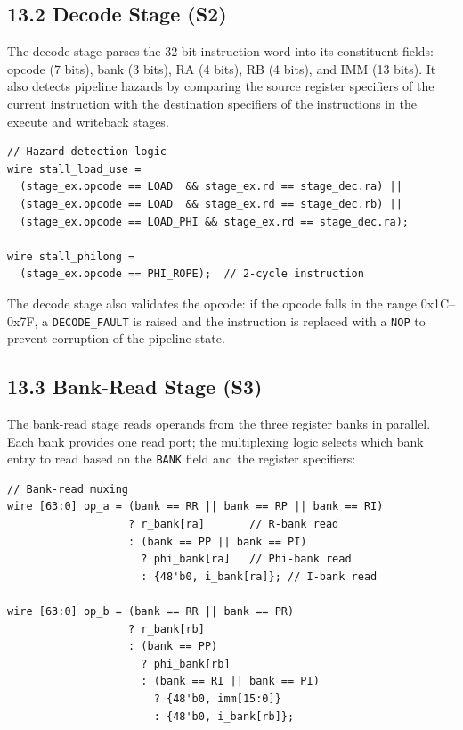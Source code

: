\subsection{13.2 Decode Stage (S2)}\label{fa_71:decode}

The decode stage parses the 32-bit instruction word into its
constituent fields: opcode (7 bits), bank (3 bits), RA (4 bits),
RB (4 bits), and IMM (13 bits). It also detects pipeline hazards
by comparing the source register specifiers of the current
instruction with the destination specifiers of the instructions
in the execute and writeback stages.

\begin{verbatim}
// Hazard detection logic
wire stall_load_use =
  (stage_ex.opcode == LOAD  && stage_ex.rd == stage_dec.ra) ||
  (stage_ex.opcode == LOAD  && stage_ex.rd == stage_dec.rb) ||
  (stage_ex.opcode == LOAD_PHI && stage_ex.rd == stage_dec.ra);

wire stall_philong =
  (stage_ex.opcode == PHI_ROPE);  // 2-cycle instruction
\end{verbatim}

The decode stage also validates the opcode: if the opcode falls
in the range 0x1C--0x7F, a \texttt{DECODE\_FAULT} is raised and
the instruction is replaced with a \texttt{NOP} to prevent
corruption of the pipeline state.

\subsection{13.3 Bank-Read Stage (S3)}\label{fa_71:bank-read}

The bank-read stage reads operands from the three register banks
in parallel. Each bank provides one read port; the multiplexing
logic selects which bank entry to read based on the \texttt{BANK}
field and the register specifiers:

\begin{verbatim}
// Bank-read muxing
wire [63:0] op_a = (bank == RR || bank == RP || bank == RI)
                   ? r_bank[ra]       // R-bank read
                   : (bank == PP || bank == PI)
                     ? phi_bank[ra]   // Phi-bank read
                     : {48'b0, i_bank[ra]}; // I-bank read

wire [63:0] op_b = (bank == RR || bank == PR)
                   ? r_bank[rb]
                   : (bank == PP)
                     ? phi_bank[rb]
                     : (bank == RI || bank == PI)
                       ? {48'b0, imm[15:0]}
                       : {48'b0, i_bank[rb]};
\end{verbatim}

